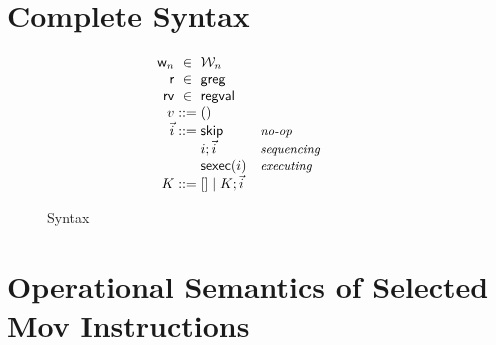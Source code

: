 \documentclass[acmsmall]{acmart}
\begin{document}

%










\begin{appendix}
\section{Complete Syntax}
\label{appendix:syntax}
\begin{figure}[!ht]
\newcommand{\commentary}[1]{ & \text{\small\it #1} \\}
\[
  \begin{array}{r@{\;}c@{\;}l}
    \loc & \in & \Loc \\
    \reg & \in & \regset \\
    \regval & \in & \regvaltype \\
    \val & ::= & \vunit

\\
    \instrs & ::= &
    \begin{array}[t]{@{}l@{\hspace{10mm}}l@{}}
    \begin{array}[t]{@{}ll@{}}
      \iskip
                   \commentary{no-op}
      \iseq\instr\instrs
                   \commentary{sequencing}
      \ising\instr
                   \commentary{executing}             
    \end{array}
    \end{array}
    \\

    \ectx & ::= &
      \hole \mid
      \iseq\ectx\instrs 
    \\
  \end{array}
\]
\caption{Syntax}
\label{fig:syntax}
\end{figure}
\section{Operational Semantics of Selected Mov Instructions}
\label{appendix:movops}


\end{appendix}
\end{document}
